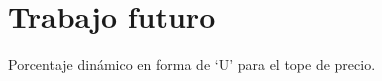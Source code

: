 \documentclass[12pt]{report}
\begin{document}
\chapter{Trabajo futuro}
Porcentaje dinámico en forma de `U' para el tope de precio.

 
 


\end{document}
